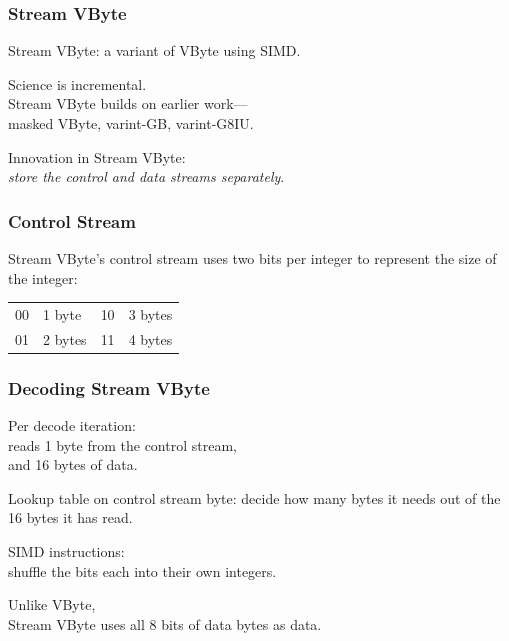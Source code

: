 \begin{frame}
\frametitle{Stream VByte}
\vspace*{-2em}
\large\begin{changemargin}{2cm}
Stream VByte: a variant of VByte using SIMD.


Science is incremental. \\
Stream VByte builds on earlier work---\\
\hspace*{2em}masked VByte, {\sc varint}-GB, {\sc varint}-G8IU. 

Innovation in Stream VByte:\\
\hspace*{2em}\emph{store the control and data streams separately}.
\end{changemargin}

\end{frame}

\begin{frame}
\frametitle{Control Stream}
\vspace*{-4em}
\large\begin{changemargin}{2cm}
Stream VByte's control stream uses two bits per integer to represent the size of the integer:
\begin{center}
\vspace*{-3em}
\begin{tabular}{ll@{~~~~~~~~}ll}
00 & 1 byte & 10 & 3 bytes\\
01 & 2 bytes & 11 & 4 bytes
\end{tabular}
\end{center}
\end{changemargin}

\end{frame}


\begin{frame}
\frametitle{Decoding Stream VByte}

\large\begin{changemargin}{2cm}
Per decode iteration:\\
\hspace*{2em} reads 1 byte from the control stream,\\
\hspace*{2em} and 16 bytes of data.


Lookup table on control stream byte: decide how many
bytes it needs out of the 16 bytes it has read.

SIMD instructions: \\
\hspace*{2em}shuffle the bits each into their own integers. 

Unlike VByte, \\
Stream VByte uses all 8 bits
of data bytes as data.
\end{changemargin}

\end{frame}



